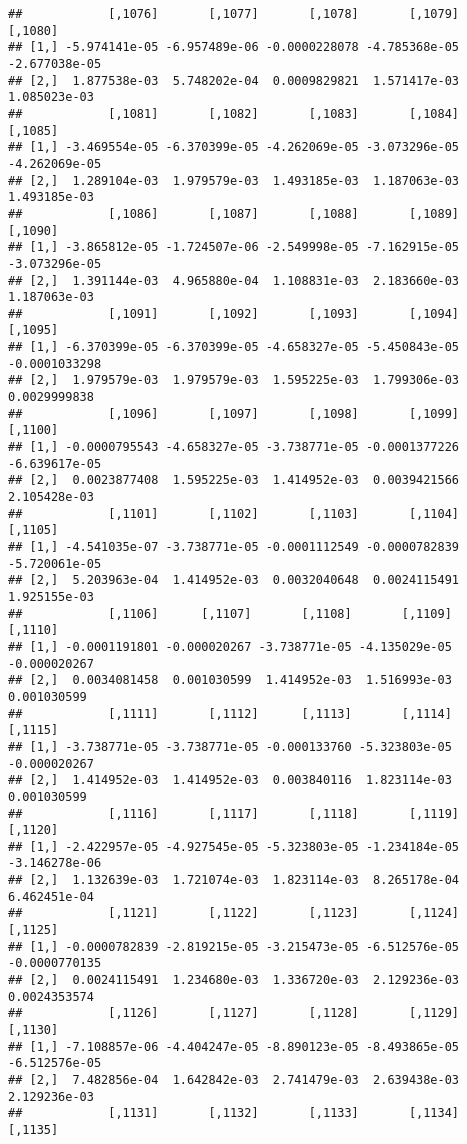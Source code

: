 \documentclass[
]{article}
\begin{document}
\begin{verbatim}
##            [,1076]       [,1077]       [,1078]       [,1079]       [,1080]
## [1,] -5.974141e-05 -6.957489e-06 -0.0000228078 -4.785368e-05 -2.677038e-05
## [2,]  1.877538e-03  5.748202e-04  0.0009829821  1.571417e-03  1.085023e-03
##            [,1081]       [,1082]       [,1083]       [,1084]       [,1085]
## [1,] -3.469554e-05 -6.370399e-05 -4.262069e-05 -3.073296e-05 -4.262069e-05
## [2,]  1.289104e-03  1.979579e-03  1.493185e-03  1.187063e-03  1.493185e-03
##            [,1086]       [,1087]       [,1088]       [,1089]       [,1090]
## [1,] -3.865812e-05 -1.724507e-06 -2.549998e-05 -7.162915e-05 -3.073296e-05
## [2,]  1.391144e-03  4.965880e-04  1.108831e-03  2.183660e-03  1.187063e-03
##            [,1091]       [,1092]       [,1093]       [,1094]       [,1095]
## [1,] -6.370399e-05 -6.370399e-05 -4.658327e-05 -5.450843e-05 -0.0001033298
## [2,]  1.979579e-03  1.979579e-03  1.595225e-03  1.799306e-03  0.0029999838
##            [,1096]       [,1097]       [,1098]       [,1099]       [,1100]
## [1,] -0.0000795543 -4.658327e-05 -3.738771e-05 -0.0001377226 -6.639617e-05
## [2,]  0.0023877408  1.595225e-03  1.414952e-03  0.0039421566  2.105428e-03
##            [,1101]       [,1102]       [,1103]       [,1104]       [,1105]
## [1,] -4.541035e-07 -3.738771e-05 -0.0001112549 -0.0000782839 -5.720061e-05
## [2,]  5.203963e-04  1.414952e-03  0.0032040648  0.0024115491  1.925155e-03
##            [,1106]      [,1107]       [,1108]       [,1109]      [,1110]
## [1,] -0.0001191801 -0.000020267 -3.738771e-05 -4.135029e-05 -0.000020267
## [2,]  0.0034081458  0.001030599  1.414952e-03  1.516993e-03  0.001030599
##            [,1111]       [,1112]      [,1113]       [,1114]      [,1115]
## [1,] -3.738771e-05 -3.738771e-05 -0.000133760 -5.323803e-05 -0.000020267
## [2,]  1.414952e-03  1.414952e-03  0.003840116  1.823114e-03  0.001030599
##            [,1116]       [,1117]       [,1118]       [,1119]       [,1120]
## [1,] -2.422957e-05 -4.927545e-05 -5.323803e-05 -1.234184e-05 -3.146278e-06
## [2,]  1.132639e-03  1.721074e-03  1.823114e-03  8.265178e-04  6.462451e-04
##            [,1121]       [,1122]       [,1123]       [,1124]       [,1125]
## [1,] -0.0000782839 -2.819215e-05 -3.215473e-05 -6.512576e-05 -0.0000770135
## [2,]  0.0024115491  1.234680e-03  1.336720e-03  2.129236e-03  0.0024353574
##            [,1126]       [,1127]       [,1128]       [,1129]       [,1130]
## [1,] -7.108857e-06 -4.404247e-05 -8.890123e-05 -8.493865e-05 -6.512576e-05
## [2,]  7.482856e-04  1.642842e-03  2.741479e-03  2.639438e-03  2.129236e-03
##            [,1131]       [,1132]       [,1133]       [,1134]       [,1135]

\end{verbatim}
\end{document}
